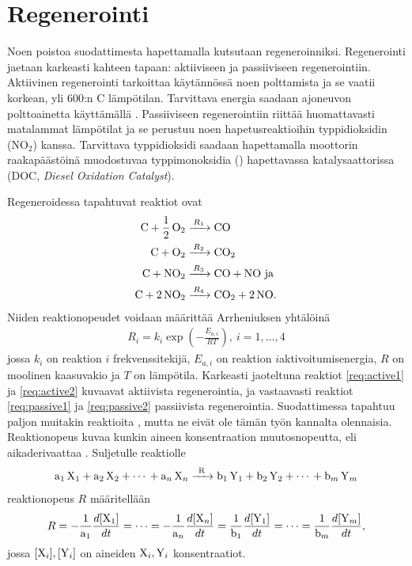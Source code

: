 \section{Regenerointi}
Noen poistoa suodattimesta hapettamalla kutsutaan regeneroinniksi. Regenerointi jaetaan karkeasti kahteen tapaan: aktiiviseen ja passiiviseen regenerointiin. 
Aktiivinen regenerointi tarkoittaa käytännössä noen polttamista ja se
vaatii korkean, yli 600:n \degree C lämpötilan. Tarvittava energia saadaan ajoneuvon polttoainetta käyttämällä \cite{dieselnet_dpf}. Passiiviseen regenerointiin riittää huomattavasti matalammat lämpötilat ja se perustuu noen hapetusreaktioihin typpidioksidin (NO\(_2\)) kanssa. Tarvittava typpidioksidi saadaan hapettamalla moottorin raakapäästöinä muodostuvaa typpimonoksidia () hapettavassa katalysaattorissa (DOC, \emph{Diesel Oxidation Catalyst}).

Regeneroidessa tapahtuvat reaktiot ovat  
\begin{align}
    \ce{C + 1/2 O2 &->[$R_1$] CO }\label{req:active1}\\
    \ce{C + O2 &->[$R_2$] CO2}\label{req:active2}\\
    \ce{C + NO2 &->[$R_3$] CO +  NO} \text{ ja }  \label{req:passive1} \\
    \ce{C + 2 NO2 &->[$R_4$] CO2 + 2 NO}. \label{req:passive2}
\end{align}
Niiden reaktionopeudet voidaan määrittää Arrheniuksen yhtälöinä \cite{LiuGuanlin2021Roio} \cite{Penghao_regen}
\begin{align}
    R_i =  k_i \exp\left({-\frac{E_{a,i}}{RT}}\right),\ i = 1,\ldots,4
\end{align}
jossa \(k_i\) on reaktion \(i\) frekvenssitekijä, \(E_{a, i}\) on  reaktion \(i\)aktivoitumisenergia, \(R\) on moolinen kaasuvakio ja \(T\) on lämpötila. Karkeasti jaoteltuna reaktiot \eqref{req:active1} ja \eqref{req:active2} kuvaavat aktiivista regenerointia, ja vastaavasti reaktiot \eqref{req:passive1} ja \eqref{req:passive2} passiivista regenerointia.
Suodattimessa tapahtuu paljon muitakin reaktioita \cite{Penghao_regen}, mutta ne eivät ole tämän työn kannalta olennaisia.
Reaktionopeus kuvaa kunkin aineen konsentraation muutosnopeutta, eli aikaderivaattaa \cite[s. 24-26]{chemical_reaction_kinetics}. Suljetulle reaktiolle
\begin{align}
    \ce{a1 X1 + a2 X2 + \cdots {} + a_n X_n ->[R] b1 Y1 + b2 Y2 + \cdots {} + b_m Y_m}
\end{align}
reaktionopeus \(R\) määritellään
\begin{align}
    R   = -\frac{1}{\ce{a1}}\frac{d[\ce{X1}]}{dt} 
        = \cdots 
        = -\frac{1}{\ce{a_n}}\frac{d[\ce{X_n}]}{dt}
        = \frac{1}{\ce{b1}}\frac{d[\ce{Y1}]}{dt} 
        = \cdots 
        = \frac{1}{\ce{b_m}}\frac{d[\ce{Y_m}]}{dt},
\end{align}
jossa \(\ce{[X_i], [Y_i]}\) on aineiden \(\ce{X_i, Y_i}\) konsentraatiot. 

